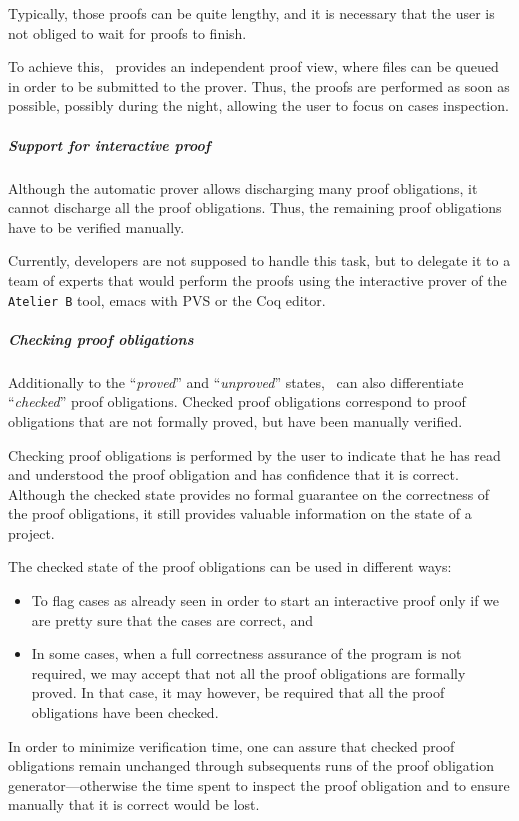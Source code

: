 Typically, those proofs can be quite lengthy, and it is necessary that
the user is not obliged to wait for proofs to finish.

To achieve this, \JACK\ provides an independent proof view, where
files can be queued in order to be submitted to the prover. Thus, the
proofs are performed as soon as possible, possibly during the night,
allowing the user to focus on cases inspection.

\subparagraph{Support for interactive proof}
Although the automatic prover allows discharging many proof
obligations, it cannot discharge all the proof obligations. Thus, the
remaining proof obligations have to be verified manually.

Currently, developers are not supposed to handle this task, but to
delegate it to a team of experts that would perform the proofs using
the interactive prover of the \texttt{Atelier B} tool, emacs with PVS
or the Coq editor.


\subparagraph{Checking proof obligations}
Additionally to the ``\textit{proved}'' and ``\textit{unproved}''
states, \JACK\ can also differentiate ``\textit{checked}'' proof
obligations. Checked proof obligations correspond to proof obligations
that are not formally proved, but have been manually verified.

Checking proof obligations is performed by the user to indicate that
he has read and understood the proof obligation and has confidence
that it is correct. Although the checked state provides no formal
guarantee on the correctness of the proof obligations, it still
provides valuable information on the state of a project.

The checked state of the proof obligations can be used in different
ways:
\begin{itemize}
\item To flag cases as already seen in order to start an interactive
   proof only if we are pretty sure that the cases are correct, and
\item In some cases, when a full correctness assurance of the program is not
   required, we may accept that not all the proof obligations are
   formally proved. In that case, it may however, be required that all
   the proof obligations have been checked.
\end{itemize}
In order to minimize verification time, one can assure that checked
proof obligations remain unchanged through subsequents runs of the
proof obligation generator---otherwise the time spent to inspect the
proof obligation and to ensure manually that it is correct would be
lost. 

